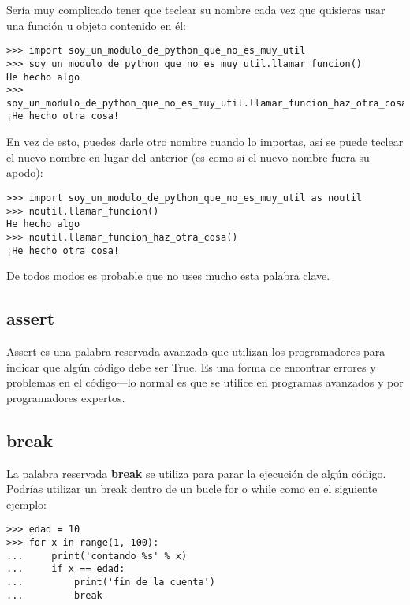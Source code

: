 \noindent
Sería muy complicado tener que teclear su nombre cada vez que quisieras usar una función u objeto contenido en él:

\begin{listingignore}
\begin{verbatim}
>>> import soy_un_modulo_de_python_que_no_es_muy_util
>>> soy_un_modulo_de_python_que_no_es_muy_util.llamar_funcion()
He hecho algo
>>> soy_un_modulo_de_python_que_no_es_muy_util.llamar_funcion_haz_otra_cosa()
¡He hecho otra cosa!
\end{verbatim}
\end{listingignore}

\noindent
En vez de esto, puedes darle otro nombre cuando lo importas, así se puede teclear el nuevo nombre en lugar del anterior (es como si el nuevo nombre fuera su apodo):

\begin{listingignore}
\begin{verbatim}
>>> import soy_un_modulo_de_python_que_no_es_muy_util as noutil
>>> noutil.llamar_funcion()
He hecho algo
>>> noutil.llamar_funcion_haz_otra_cosa()
¡He hecho otra cosa!
\end{verbatim}
\end{listingignore}

\noindent
De todos modos es probable que no uses mucho esta palabra clave.

\subsection*{assert}

Assert es una palabra reservada avanzada que utilizan los programadores para indicar que algún código debe ser True.  Es una forma de encontrar errores y problemas en el código---lo normal es que se utilice en programas avanzados y por programadores expertos.

\subsection*{break}

La palabra reservada \textbf{break} se utiliza para parar la ejecución de algún código. Podrías utilizar un break dentro de un bucle for o while como en el siguiente ejemplo:

\begin{listing}
\begin{verbatim}
>>> edad = 10
>>> for x in range(1, 100):
...     print('contando %s' % x)
...     if x == edad:
...         print('fin de la cuenta')
...         break
\end{verbatim}
\end{listing}

